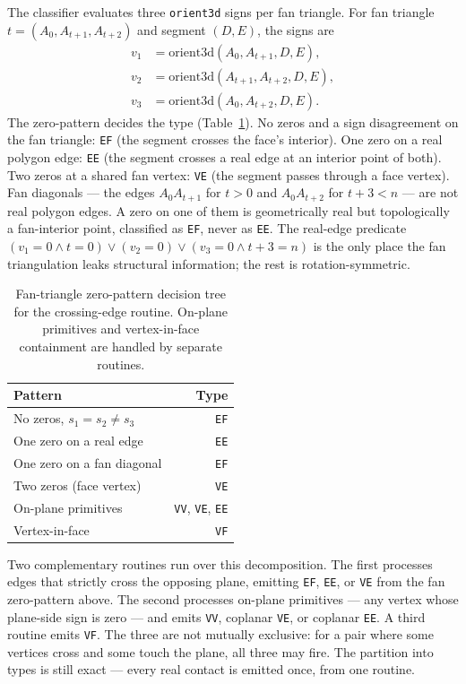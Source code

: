 \documentclass{egpubl}
\begin{document}
The classifier evaluates three \texttt{orient3d} signs per fan triangle. For fan triangle $t = (A_0, A_{t+1}, A_{t+2})$ and segment $(D, E)$, the signs are
\[
\begin{aligned}
v_1 &= \mathrm{orient3d}(A_0,     A_{t+1}, D, E),\\
v_2 &= \mathrm{orient3d}(A_{t+1}, A_{t+2}, D, E),\\
v_3 &= \mathrm{orient3d}(A_0,     A_{t+2}, D, E).
\end{aligned}
\]
The zero-pattern decides the type (Table~\ref{tab:fan_zero_patterns}). No zeros and a sign disagreement on the fan triangle: \texttt{EF} (the segment crosses the face's interior). One zero on a real polygon edge: \texttt{EE} (the segment crosses a real edge at an interior point of both). Two zeros at a shared fan vertex: \texttt{VE} (the segment passes through a face vertex). Fan diagonals --- the edges $A_0 A_{t+1}$ for $t > 0$ and $A_0 A_{t+2}$ for $t + 3 < n$ --- are not real polygon edges. A zero on one of them is geometrically real but topologically a fan-interior point, classified as \texttt{EF}, never as \texttt{EE}. The real-edge predicate $(v_1 = 0 \land t = 0) \lor (v_2 = 0) \lor (v_3 = 0 \land t + 3 = n)$ is the only place the fan triangulation leaks structural information; the rest is rotation-symmetric.

\begin{table}[t]
\centering
\caption{Fan-triangle zero-pattern decision tree for the crossing-edge routine. On-plane primitives and vertex-in-face containment are handled by separate routines.}
\label{tab:fan_zero_patterns}
\begin{tabular*}{\columnwidth}{@{\extracolsep{\fill}}lr@{}}
\toprule
Pattern & Type \\
\midrule
No zeros, $s_1 = s_2 \ne s_3$  & \texttt{EF} \\
One zero on a real edge        & \texttt{EE} \\
One zero on a fan diagonal     & \texttt{EF} \\
Two zeros (face vertex)        & \texttt{VE} \\
\midrule
On-plane primitives            & \texttt{VV}, \texttt{VE}, \texttt{EE} \\
Vertex-in-face                 & \texttt{VF} \\
\bottomrule
\end{tabular*}
\end{table}

Two complementary routines run over this decomposition. The first processes edges that strictly cross the opposing plane, emitting \texttt{EF}, \texttt{EE}, or \texttt{VE} from the fan zero-pattern above. The second processes on-plane primitives --- any vertex whose plane-side sign is zero --- and emits \texttt{VV}, coplanar \texttt{VE}, or coplanar \texttt{EE}. A third routine emits \texttt{VF}. The three are not mutually exclusive: for a pair where some vertices cross and some touch the plane, all three may fire. The partition into types is still exact --- every real contact is emitted once, from one routine.
\end{document}

